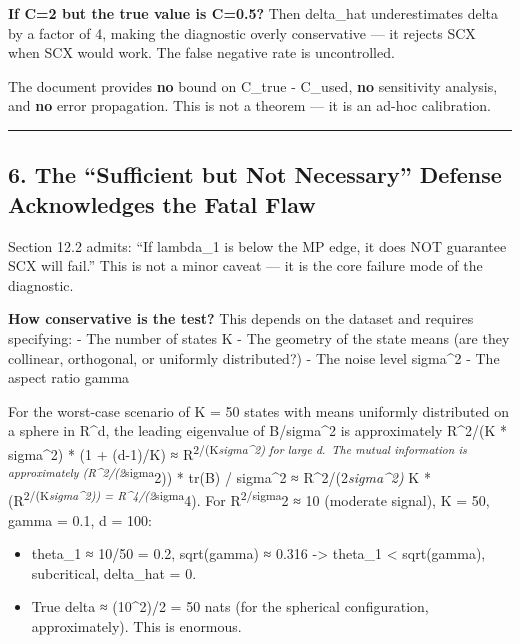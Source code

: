 \documentclass[
  12pt,
]{article}
\providecommand{\tightlist}{%
  \setlength{\itemsep}{0pt}\setlength{\parskip}{0pt}}
\begin{document}
\textbf{If C=2 but the true value is C=0.5?} Then delta\_hat
underestimates delta by a factor of 4, making the diagnostic overly
conservative --- it rejects SCX when SCX would work. The false negative
rate is uncontrolled.

The document provides \textbf{no} bound on \textbar C\_true -
C\_used\textbar, \textbf{no} sensitivity analysis, and \textbf{no} error
propagation. This is not a theorem --- it is an ad-hoc calibration.

\begin{center}\rule{0.5\linewidth}{0.5pt}\end{center}

\subsection{6. The ``Sufficient but Not Necessary'' Defense Acknowledges
the Fatal
Flaw}\label{the-sufficient-but-not-necessary-defense-acknowledges-the-fatal-flaw}

Section 12.2 admits: ``If lambda\_1 is below the MP edge, it does NOT
guarantee SCX will fail.'' This is not a minor caveat --- it is the core
failure mode of the diagnostic.

\textbf{How conservative is the test?} This depends on the dataset and
requires specifying: - The number of states K - The geometry of the
state means (are they collinear, orthogonal, or uniformly distributed?)
- The noise level sigma\^{}2 - The aspect ratio gamma

For the worst-case scenario of K = 50 states with means uniformly
distributed on a sphere in R\^{}d, the leading eigenvalue of
B/sigma\^{}2 is approximately R\^{}2/(K * sigma\^{}2) * (1 + (d-1)/K) ≈
R\textsuperscript{2/(K\emph{sigma\^{}2) for large d.~The mutual
information is approximately (R\^{}2/(2}sigma}2)) * tr(B) / sigma\^{}2 ≈
R\^{}2/(2\emph{sigma\^{}2) } K *
(R\textsuperscript{2/(K\emph{sigma\^{}2)) = R\^{}4/(2}sigma}4). For
R\textsuperscript{2/sigma}2 ≈ 10 (moderate signal), K = 50, gamma = 0.1,
d = 100:

\begin{itemize}
\tightlist
\item
  theta\_1 ≈ 10/50 = 0.2, sqrt(gamma) ≈ 0.316 -\textgreater{} theta\_1
  \textless{} sqrt(gamma), subcritical, delta\_hat = 0.
\item
  True delta ≈ (10\^{}2)/2 = 50 nats (for the spherical configuration,
  approximately). This is enormous.
\end{itemize}
\end{document}
